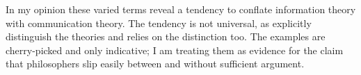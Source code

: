 \noindent In my opinion these varied terms reveal a tendency to conflate information theory with communication theory.
The tendency is not universal, as \citet[17-20]{piccinini2011information} explicitly distinguish the theories and \citet{rathkopf2017neural} relies on the distinction too.
The examples are cherry-picked and only indicative; I am treating them as evidence for the claim that philosophers slip easily between \ait{} and \act{} without sufficient argument.






